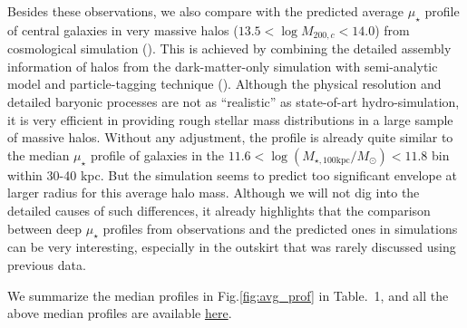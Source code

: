 \documentclass{emulateapj}
\def\logmtot{{$\log (M_{\star,100\mathrm{kpc}}/M_{\odot})$}}
\def\mden{{$\mu_{\star}$}}
\begin{document}
\begin{CJK*}{UTF8}{gbsn}
    Besides these observations, we also compare with the predicted average \mden{} 
    profile of central galaxies in very massive halos 
    ($13.5 < \log M_{200,c} < 14.0$) from cosmological simulation (\citealt{Cooper13}). 
    This is achieved by combining the detailed assembly information of halos from the 
    dark-matter-only simulation with semi-analytic model and particle-tagging technique 
    (\citealt{Cooper10}).
    Although the physical resolution and detailed baryonic processes are not as 
    ``realistic'' as state-of-art hydro-simulation, it is very efficient in providing 
    rough stellar mass distributions in a large sample of massive halos. 
    Without any adjustment, the profile is already quite similar to the median \mden{}
    profile of galaxies in the $11.6 <$\logmtot{}$< 11.8$ bin within 30-40 kpc. 
    But the simulation seems to predict too significant envelope at larger radius for 
    this average halo mass. 
    Although we will not dig into the detailed causes of such differences, it already 
    highlights that the comparison between deep \mden{} profiles from observations 
    and the predicted ones in simulations can be very interesting, especially in the 
    outskirt that was rarely discussed using previous data. 
    
    We summarize the median profiles in Fig.\ref{fig:avg_prof} in Table.~1,
    and all the above median profiles are available  
    \href{https://github.com/dr-guangtou/hsc_cenHighMh/tree/master/profiles}{here}.


\end{CJK*}
\end{document}
